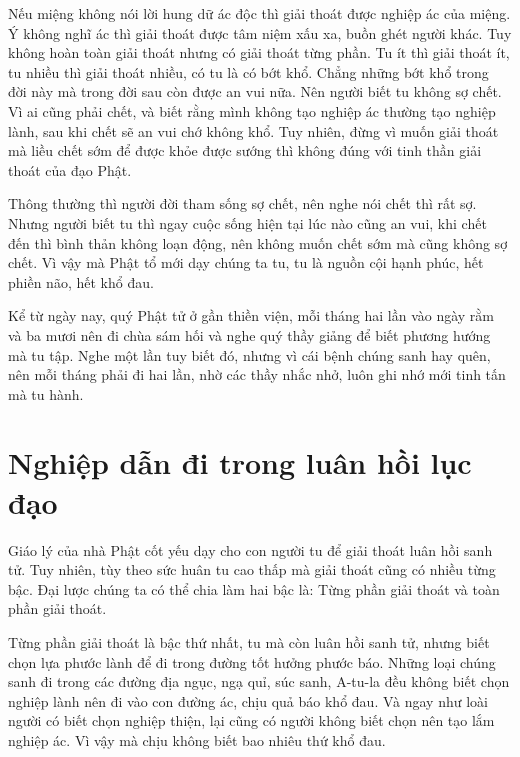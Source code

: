 \documentclass[
  12pt,
  oneside]{book}
\begin{document}
Nếu miệng không nói lời hung dữ ác độc thì giải thoát được nghiệp ác của miệng. Ý không nghĩ ác thì giải thoát được tâm niệm xấu xa, buồn ghét người khác. Tuy không hoàn toàn giải thoát nhưng có giải thoát từng phần. Tu ít thì giải thoát ít, tu nhiều thì giải thoát nhiều, có tu là có bớt khổ. Chẳng những bớt khổ trong đời này mà trong đời sau còn được an vui nữa. Nên người biết tu không sợ chết. Vì ai cũng phải chết, và biết rằng mình không tạo nghiệp ác thường tạo nghiệp lành, sau khi chết sẽ an vui chớ không khổ. Tuy nhiên, đừng vì muốn giải thoát mà liều chết sớm để được khỏe được sướng thì không đúng với tinh thần giải thoát của đạo Phật.

Thông thường thì người đời tham sống sợ chết, nên nghe nói chết thì rất sợ. Nhưng người biết tu thì ngay cuộc sống hiện tại lúc nào cũng an vui, khi chết đến thì bình thản không loạn động, nên không muốn chết sớm mà cũng không sợ chết. Vì vậy mà Phật tổ mới dạy chúng ta tu, tu là nguồn cội hạnh phúc, hết phiền não, hết khổ đau.

Kể từ ngày nay, quý Phật tử ở gần thiền viện, mỗi tháng hai lần vào ngày rằm và ba mươi nên đi chùa sám hối và nghe quý thầy giảng để biết phương hướng mà tu tập. Nghe một lần tuy biết đó, nhưng vì cái bệnh chúng sanh hay quên, nên mỗi tháng phải đi hai lần, nhờ các thầy nhắc nhở, luôn ghi nhớ mới tinh tấn mà tu hành.

\hypertarget{nghiep-dan-di-trong-luan-hoi-luc-dao}{%
\chapter*{Nghiệp dẫn đi trong luân hồi lục đạo}\label{nghiep-dan-di-trong-luan-hoi-luc-dao}}

Giáo lý của nhà Phật cốt yếu dạy cho con người tu để giải thoát luân hồi sanh tử. Tuy nhiên, tùy theo sức huân tu cao thấp mà giải thoát cũng có nhiều từng bậc. Đại lược chúng ta có thể chia làm hai bậc là: Từng phần giải thoát và toàn phần giải thoát.

Từng phần giải thoát là bậc thứ nhất, tu mà còn luân hồi sanh tử, nhưng biết chọn lựa phước lành để đi trong đường tốt hưởng phước báo. Những loại chúng sanh đi trong các đường địa ngục, ngạ quỉ, súc sanh, A-tu-la đều không biết chọn nghiệp lành nên đi vào con đường ác, chịu quả báo khổ đau. Và ngay như loài người có biết chọn nghiệp thiện, lại cũng có người không biết chọn nên tạo lắm nghiệp ác. Vì vậy mà chịu không biết bao nhiêu thứ khổ đau.
\end{document}
